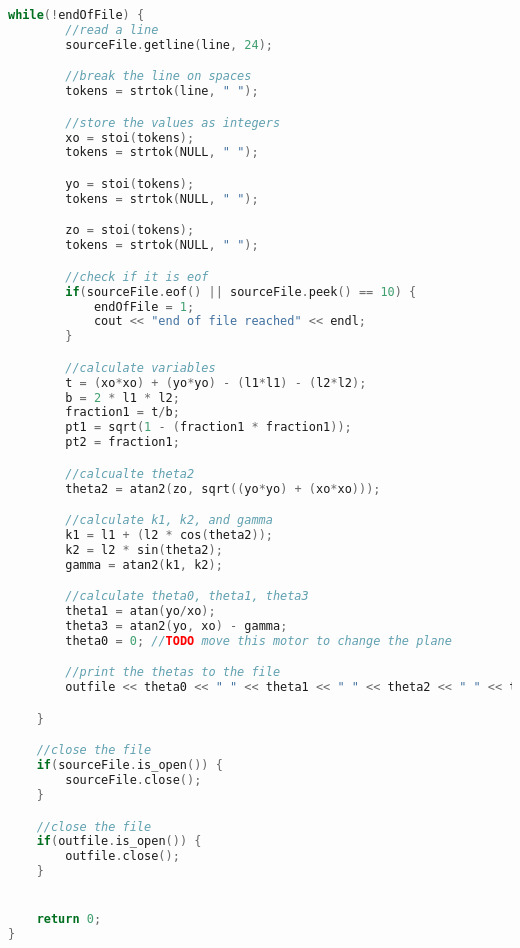 \begin{lstlisting}[language=C++]
	while(!endOfFile) {
		//read a line
		sourceFile.getline(line, 24);

		//break the line on spaces
		tokens = strtok(line, " ");

		//store the values as integers
		xo = stoi(tokens);
		tokens = strtok(NULL, " ");

		yo = stoi(tokens);
		tokens = strtok(NULL, " ");

		zo = stoi(tokens);
		tokens = strtok(NULL, " ");

		//check if it is eof
		if(sourceFile.eof() || sourceFile.peek() == 10) {
			endOfFile = 1;
			cout << "end of file reached" << endl;
		}

		//calculate variables
		t = (xo*xo) + (yo*yo) - (l1*l1) - (l2*l2);
		b = 2 * l1 * l2;
		fraction1 = t/b;
		pt1 = sqrt(1 - (fraction1 * fraction1));
		pt2 = fraction1;

		//calcualte theta2
		theta2 = atan2(zo, sqrt((yo*yo) + (xo*xo)));

		//calculate k1, k2, and gamma
		k1 = l1 + (l2 * cos(theta2));
		k2 = l2 * sin(theta2);
		gamma = atan2(k1, k2);

		//calculate theta0, theta1, theta3
		theta1 = atan(yo/xo);
		theta3 = atan2(yo, xo) - gamma;
		theta0 = 0; //TODO move this motor to change the plane

		//print the thetas to the file
		outfile << theta0 << " " << theta1 << " " << theta2 << " " << theta3 << " " << endl;

	}

	//close the file
	if(sourceFile.is_open()) {
		sourceFile.close();
	}

	//close the file
	if(outfile.is_open()) {
		outfile.close();
	}


	return 0;
}
\end{lstlisting}

